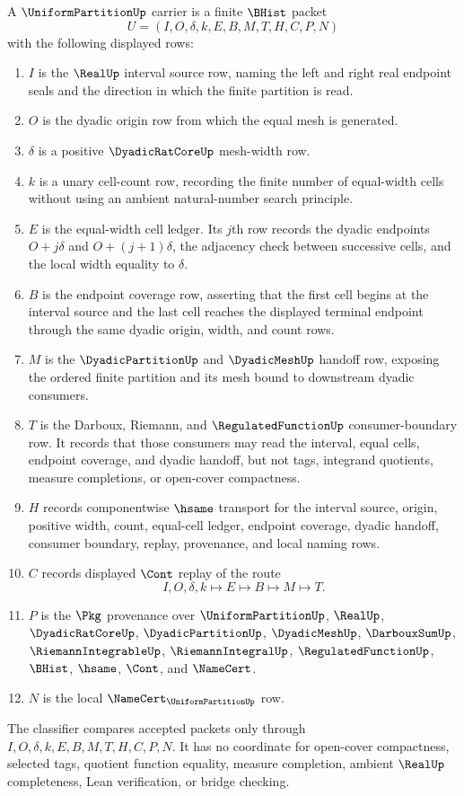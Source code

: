 \begin{definition}
\label{def:uniform-partition-carrier}
A $\UniformPartitionUp$ carrier is a finite $\BHist$ packet
$$
U=(I,O,\delta,k,E,B,M,T,H,C,P,N)
$$
with the following displayed rows:
\begin{enumerate}
\item $I$ is the $\RealUp$ interval source row, naming the left and right real endpoint seals and the direction in which the finite partition is read.
\item $O$ is the dyadic origin row from which the equal mesh is generated.
\item $\delta$ is a positive $\DyadicRatCoreUp$ mesh-width row.
\item $k$ is a unary cell-count row, recording the finite number of equal-width cells without using an ambient natural-number search principle.
\item $E$ is the equal-width cell ledger. Its $j$th row records the dyadic endpoints $O+j\delta$ and $O+(j+1)\delta$, the adjacency check between successive cells, and the local width equality to $\delta$.
\item $B$ is the endpoint coverage row, asserting that the first cell begins at the interval source and the last cell reaches the displayed terminal endpoint through the same dyadic origin, width, and count rows.
\item $M$ is the $\DyadicPartitionUp$ and $\DyadicMeshUp$ handoff row, exposing the ordered finite partition and its mesh bound to downstream dyadic consumers.
\item $T$ is the Darboux, Riemann, and $\RegulatedFunctionUp$ consumer-boundary row. It records that those consumers may read the interval, equal cells, endpoint coverage, and dyadic handoff, but not tags, integrand quotients, measure completions, or open-cover compactness.
\item $H$ records componentwise $\hsame$ transport for the interval source, origin, positive width, count, equal-cell ledger, endpoint coverage, dyadic handoff, consumer boundary, replay, provenance, and local naming rows.
\item $C$ records displayed $\Cont$ replay of the route
$$
I,O,\delta,k \longmapsto E \longmapsto B \longmapsto M \longmapsto T .
$$
\item $P$ is the $\Pkg$ provenance over $\UniformPartitionUp$, $\RealUp$, $\DyadicRatCoreUp$, $\DyadicPartitionUp$, $\DyadicMeshUp$, $\DarbouxSumUp$, $\RiemannIntegrableUp$, $\RiemannIntegralUp$, $\RegulatedFunctionUp$, $\BHist$, $\hsame$, $\Cont$, and $\NameCert$.
\item $N$ is the local $\NameCert_{\UniformPartitionUp}$ row.
\end{enumerate}
The classifier compares accepted packets only through $I,O,\delta,k,E,B,M,T,H,C,P,N$. It has no coordinate for open-cover compactness, selected tags, quotient function equality, measure completion, ambient $\RealUp$ completeness, Lean verification, or bridge checking.
\end{definition}

